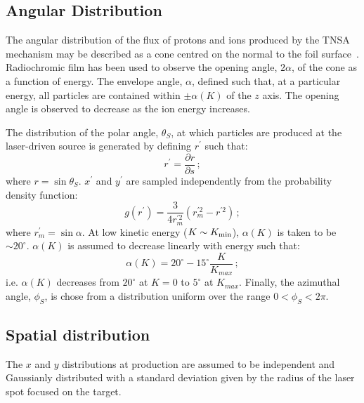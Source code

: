\subsection{Angular Distribution}

The angular distribution of the flux of protons and ions produced by
the TNSA mechanism may be described as a cone centred on the normal to
the foil surface~\cite{10.1063/1.3086424}.
Radiochromic film has been used to observe the opening angle,
$2\alpha$, of the cone as a function of energy.
The envelope angle, $\alpha$, defined such that, at a particular
energy, all particles are contained within $\pm\alpha(K)$ of
the $z$ axis.
The opening angle is observed to decrease as the ion energy
increases.

The distribution of the polar angle, $\theta_S$, at which particles
are produced at the laser-driven source is generated by defining
$r^\prime$ such that:
\begin{equation}
  r^\prime = \frac{\partial r}{\partial s}\,;
\end{equation}
where $r=\sin\theta_S$.
$x^\prime$ and $y^\prime$ are sampled independently from the
probability density function:
\begin{equation}
  g(r^\prime) = \frac{3}{4r^{\prime 2}_m} \left(r^{\prime 2}_m-r^{\prime 2} \right)\,;
\end{equation}
where $r^\prime_m=\sin\alpha$.
At low kinetic energy ($K \sim K_{\rm min}$),
$\alpha(K)$ is taken to be $\sim 20^\circ$.
$\alpha(K)$ is assumed to decrease linearly with energy such
that:
\begin{equation}
  \alpha(K) =
                20^\circ - 15^\circ \frac{K}{K_{max}} \, ;
  \label{Eq:sigVeps}
\end{equation}
i.e. $\alpha(K)$ decreases from $20^\circ$ at $K=0$
to $5^\circ$ at $K_{max}$.
Finally, the azimuthal angle, $\phi_S$, is chose from a distribution
uniform over the range $0 < \phi_S < 2\pi$.

\subsection{Spatial distribution}

The $x$ and $y$ distributions at production are assumed to be
independent and Gaussianly distributed with a standard deviation given
by the radius of the laser spot focused on the target.

